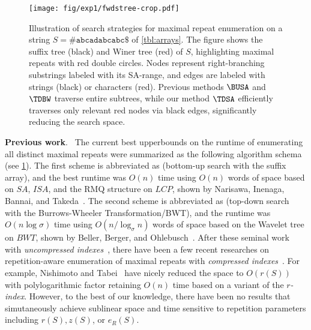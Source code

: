 

\begin{figure}[t]
\centering  
\texttt{[image: fig/exp1/fwdstree-crop.pdf]}
\smallskip
\caption{
  Illustration of search strategies for maximal repeat enumeration on a string
  $S = \mathtt{\#abcadabcabc\$}$ of \cref{tbl:arrays}. 
  The figure shows the suffix tree (black) and Winer tree (red) of $S$, highlighting maximal repeats with red double circles. Nodes represent right-branching substrings labeled with its SA-range, and edges are labeled with strings (black) or characters (red). Previous methods $\BUSA$ and $\TDBW$ traverse entire subtrees, while our method $\TDSA$ efficiently traverses only relevant red nodes via black edges, significantly reducing the search space.
}\label{fig:fwdstree}
\end{figure}



\textbf{Previous work}.\ 
The current best upperbounds on the runtime of enumerating all distinct  maximal repeats were summarized as the following algorithm schema (see \cref{fig:fwdstree}).
The first scheme is abbreviated as \BUSA{} (bottom-up search with the suffix array),  and the best runtime was $O(n)$ time using $O(n)$ words of space based on $SA$, $ISA$, and the RMQ structure on $LCP$, shown by Narisawa, Inenaga, Bannai, and Takeda~\cite{narisawa2007efficient}. 
The second scheme is abbreviated as \TDBW{} (top-down search with the Burrows-Wheeler Transformation/BWT), and the runtime was $O(n \log\sigma)$ time using $O(n/\log_\sigma n)$ words of space based on the Wavelet tree on $BWT$, shown by Beller, Berger, and Ohlebusch~\cite{beller:berger2012space:efficient:bbo}.
After these seminal work with \textit{uncompressed indexes}~\cite{narisawa2007efficient,beller:berger2012space:efficient:bbo}, there have been a few recent researches on repetition-aware enumeration of maximal repeats with \textit{compressed indexes}~\cite{belazzougui2020linear,nishimoto:cpm2021enum}. For example, Nishimoto and Tabei~\cite{nishimoto:cpm2021enum} have nicely reduced the space to $O(r(S))$ with polylogarithmic factor retaining $O(n)$ time based on a variant of the \textit{$r$-index}. However, to the best of our knowledge, there have been no results that simutaneously achieve sublinear space and time sensitive to repetition parameters including $r(S), z(S)$, or $e_R(S)$. 


